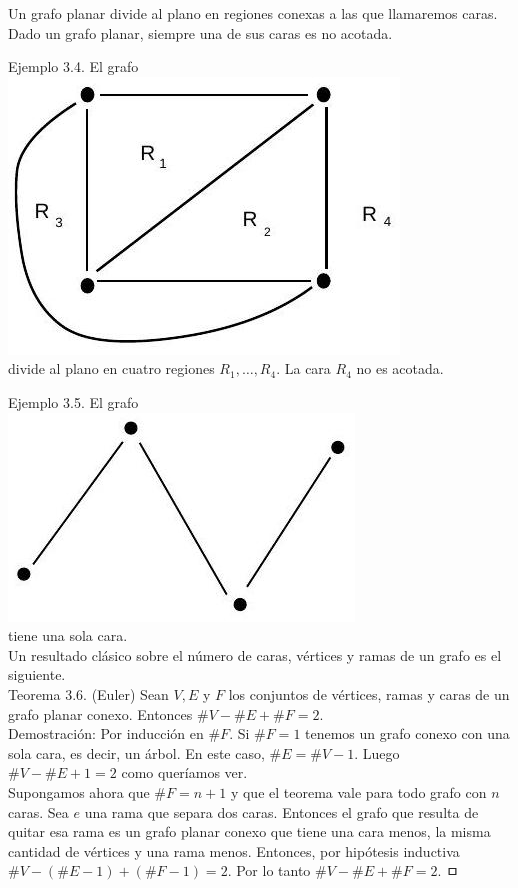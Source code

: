\documentclass[10pt]{article}
\begin{document}
Un grafo planar divide al plano en regiones conexas a las que llamaremos caras. Dado un grafo planar, siempre una de sus caras es no acotada.

Ejemplo 3.4. El grafo\\
\includegraphics[max width=\textwidth, center]{2025_09_05_93c7c1835f249f70c0eeg-06(1)}\\
divide al plano en cuatro regiones $R_{1}, \ldots, R_{4}$. La cara $R_{4}$ no es acotada.

Ejemplo 3.5. El grafo\\
\includegraphics[max width=\textwidth, center]{2025_09_05_93c7c1835f249f70c0eeg-07}\\
tiene una sola cara.\\
Un resultado clásico sobre el número de caras, vértices y ramas de un grafo es el siguiente.\\
Teorema 3.6. (Euler) Sean $V, E$ y $F$ los conjuntos de vértices, ramas y caras de un grafo planar conexo. Entonces $\# V-\# E+\# F=2$.\\
Demostración: Por inducción en $\# F$. Si $\# F=1$ tenemos un grafo conexo con una sola cara, es decir, un árbol. En este caso, $\# E=\# V-1$. Luego $\# V-\# E+1=2$ como queríamos ver.\\
Supongamos ahora que $\# F=n+1$ y que el teorema vale para todo grafo con $n$ caras. Sea $e$ una rama que separa dos caras. Entonces el grafo que resulta de quitar esa rama es un grafo planar conexo que tiene una cara menos, la misma cantidad de vértices y una rama menos. Entonces, por hipótesis inductiva $\# V-(\# E-1)+(\# F-1)=2$. Por lo tanto $\# V-\# E+\# F=2$. ㅁ
\end{document}
